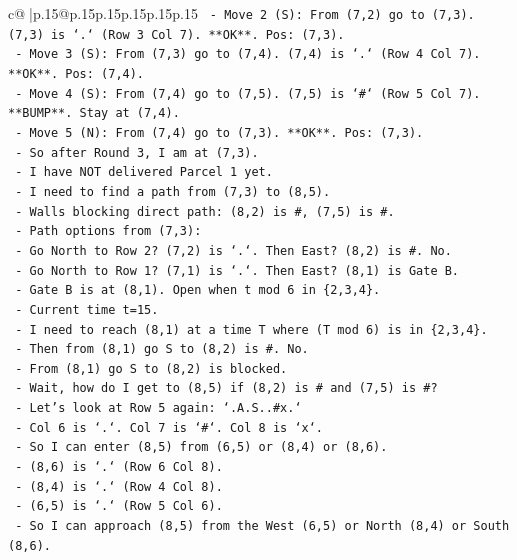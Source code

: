 \documentclass{article}
\begin{document}
{\begin{supertabular}{c@{$\;$}|p{.15\linewidth}@{}p{.15\linewidth}p{.15\linewidth}p{.15\linewidth}p{.15\linewidth}p{.15\linewidth}}
{{{\texttt{    {-} Move 2 (S): From (7,2) go to (7,3). (7,3) is `.` (Row 3 Col 7). **OK**. Pos: (7,3).} \\
\texttt{    {-} Move 3 (S): From (7,3) go to (7,4). (7,4) is `.` (Row 4 Col 7). **OK**. Pos: (7,4).} \\
\texttt{    {-} Move 4 (S): From (7,4) go to (7,5). (7,5) is `\#` (Row 5 Col 7). **BUMP**. Stay at (7,4).} \\
\texttt{    {-} Move 5 (N): From (7,4) go to (7,3). **OK**. Pos: (7,3).} \\
\texttt{  {-} So after Round 3, I am at (7,3).} \\
\texttt{  {-} I have NOT delivered Parcel 1 yet.} \\
\texttt{  {-} I need to find a path from (7,3) to (8,5).} \\
\texttt{  {-} Walls blocking direct path: (8,2) is \#, (7,5) is \#.} \\
\texttt{  {-} Path options from (7,3):} \\
\texttt{    {-} Go North to Row 2? (7,2) is `.`. Then East? (8,2) is \#. No.} \\
\texttt{    {-} Go North to Row 1? (7,1) is `.`. Then East? (8,1) is Gate B.} \\
\texttt{      {-} Gate B is at (8,1). Open when t mod 6 in \{2,3,4\}.} \\
\texttt{      {-} Current time t=15.} \\
\texttt{      {-} I need to reach (8,1) at a time T where (T mod 6) is in \{2,3,4\}.} \\
\texttt{      {-} Then from (8,1) go S to (8,2) is \#. No.} \\
\texttt{      {-} From (8,1) go S to (8,2) is blocked.} \\
\texttt{      {-} Wait, how do I get to (8,5) if (8,2) is \# and (7,5) is \#?} \\
\texttt{      {-} Let's look at Row 5 again: `.A.S..\#x.`} \\
\texttt{        {-} Col 6 is `.`. Col 7 is `\#`. Col 8 is `x`.} \\
\texttt{        {-} So I can enter (8,5) from (6,5) or (8,4) or (8,6).} \\
\texttt{        {-} (8,6) is `.` (Row 6 Col 8).} \\
\texttt{        {-} (8,4) is `.` (Row 4 Col 8).} \\
\texttt{        {-} (6,5) is `.` (Row 5 Col 6).} \\
\texttt{      {-} So I can approach (8,5) from the West (6,5) or North (8,4) or South (8,6).} \\
}}}
\end{supertabular}}
\end{document}
